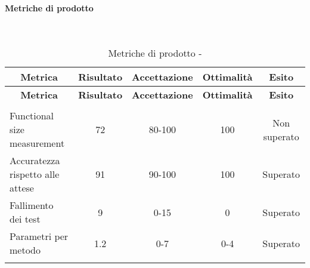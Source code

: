 \paragraph{Metriche di prodotto}\mbox{}\\
\begin{longtable}{|m{5cm}|c|c|c|c|}
	\hline \multicolumn{1}{|c|}{\textbf{Metrica}} & \multicolumn{1}{c|}{\textbf{Risultato}} & \multicolumn{1}{c|}{\textbf{Accettazione}} & \multicolumn{1}{c|}{\textbf{Ottimalità}} & \multicolumn{1}{c|}{\textbf{Esito}}\\
	\hline 
	\endfirsthead
	
	\hline \multicolumn{1}{|c|}{\textbf{Metrica}} & \multicolumn{1}{c|}{\textbf{Risultato}} & \multicolumn{1}{c|}{\textbf{Accettazione}} & \multicolumn{1}{c|}{\textbf{Ottimalità}} & \multicolumn{1}{c|}{\textbf{Esito}}\\
	\hline 
	\endhead
	
	\hline \multicolumn{5}{|r|}{\ToBeContinued} \\ 
	\hline
	\endfoot
	
	\endlastfoot
	
	\hline Functional size measurement & 72 & 80-100 & 100 & Non superato \\
	\hline Accuratezza rispetto alle attese & 91 & 90-100 & 100 & Superato\\
	\hline Fallimento dei test & 9 & 0-15 & 0 & Superato \\
	\hline Parametri per metodo & 1.2 & 0-7 & 0-4 & Superato \\
	\hline
	\caption{Metriche di prodotto - \RQ{}}
\end{longtable}